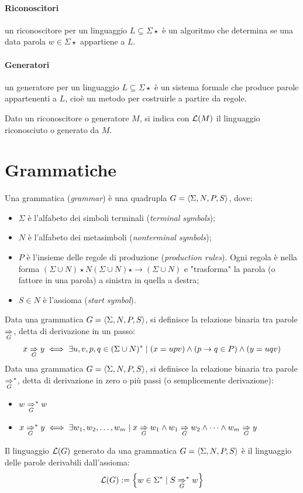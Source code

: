 \paragraph{Riconoscitori} un riconoscitore per un linguaggio $L\subseteq\Sigma\star$ è un algoritmo che determina se una data parola $w\in\Sigma\star$ appartiene a $L$.

\paragraph{Generatori} un generatore per un linguaggio $L\subseteq\Sigma\star$ è un sistema formale che produce parole appartenenti a $L$, cioè un metodo per costruirle a partire da regole.

Dato un riconoscitore o generatore $M$, si indica con $\mathcal L(M)$ il linguaggio riconosciuto o generato da $M$.



\section{Grammatiche}
\begin{defin}[grammatica]
	Una grammatica (\emph{grammar}) è una quadrupla $G=\langle \Sigma,N,P,S \rangle$, dove:
	\begin{itemize}
		\item $\Sigma$ è l'alfabeto dei simboli terminali (\emph{terminal symbols});
		\item $N$ è l'alfabeto dei metasimboli (\emph{nonterminal symbols});
		\item $P$ è l'insieme delle regole di produzione (\emph{production rules}). Ogni regola è nella forma $(\Sigma\cup N)\star N(\Sigma\cup N)\star\to(\Sigma\cup N)$ e "trasforma" la parola (o fattore in una parola) a sinistra in quella a destra;
		\item $S\in N$ è l'assioma (\emph{start symbol}).
	\end{itemize}
	Data una grammatica $G=\langle \Sigma,N,P,S \rangle$, si definisce la relazione binaria tra parole $\underset{G}{\Rightarrow}$, detta di derivazione in un passo:
	\begin{equation*}
		x\underset{G}{\Rightarrow} y \iff \exists u,v,p,q\in(\Sigma\cup N)^* \mid (x=upv)\land(p\to q\in P)\land(y=uqv)
	\end{equation*}
	Data una grammatica $G=\langle \Sigma,N,P,S \rangle$, si definisce la relazione binaria tra parole $\underset{G}{\Rightarrow}^*$, detta di derivazione in zero o più passi (o semplicemente derivazione):
	\begin{itemize}
		\item $w \underset{G}{\Rightarrow}^* w$
		\item $x \underset{G}{\Rightarrow}^* y \iff \exists w_1,w_2,\dots,w_m \mid x\underset{G}{\Rightarrow} w_1 \land w_1\underset{G}{\Rightarrow} w_2 \land\dots\land w_m\underset{G}{\Rightarrow}y$
	\end{itemize}
	Il linguaggio $\mathcal L(G)$ generato da una grammatica $G=\langle \Sigma,N,P,S \rangle$ è il linguaggio delle parole derivabili dall'assioma:
	\begin{equation*}
		\mathcal L(G) := \left\{ w\in\Sigma^*\mid S\underset{G}{\Rightarrow}^* w \right\}
	\end{equation*}
\end{defin}


